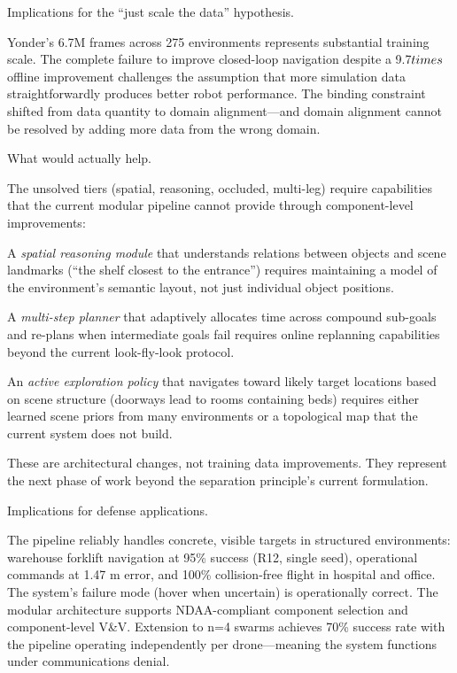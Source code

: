 \documentclass[conference]{IEEEtran}
\begin{document}
Implications for the ``just scale the data'' hypothesis.

Yonder's 6.7M frames across 275 environments represents substantial
training scale. The complete failure to improve closed-loop navigation
despite a 9.7$\\times$ offline improvement challenges the assumption that more
simulation data straightforwardly produces better robot performance. The
binding constraint shifted from data quantity to domain alignment---and
domain alignment cannot be resolved by adding more data from the wrong
domain.

What would actually help.

The unsolved tiers (spatial, reasoning, occluded, multi-leg) require
capabilities that the current modular pipeline cannot provide through
component-level improvements:

A \emph{spatial reasoning module} that understands relations between
objects and scene landmarks (``the shelf closest to the entrance'')
requires maintaining a model of the environment's semantic layout, not
just individual object positions.

A \emph{multi-step planner} that adaptively allocates time across
compound sub-goals and re-plans when intermediate goals fail requires
online replanning capabilities beyond the current look-fly-look
protocol.

An \emph{active exploration policy} that navigates toward likely target
locations based on scene structure (doorways lead to rooms containing
beds) requires either learned scene priors from many environments or a
topological map that the current system does not build.

These are architectural changes, not training data improvements. They
represent the next phase of work beyond the separation principle's
current formulation.

Implications for defense applications.

The pipeline reliably handles concrete, visible targets in structured
environments: warehouse forklift navigation at 95\% success (R12, single
seed), operational commands at 1.47 m error, and 100\% collision-free
flight in hospital and office. The system's failure mode (hover when
uncertain) is operationally correct. The modular architecture supports
NDAA-compliant component selection and component-level V\&V. Extension
to n=4 swarms achieves 70\% success rate with the pipeline operating
independently per drone---meaning the system functions under
communications denial.
\end{document}
